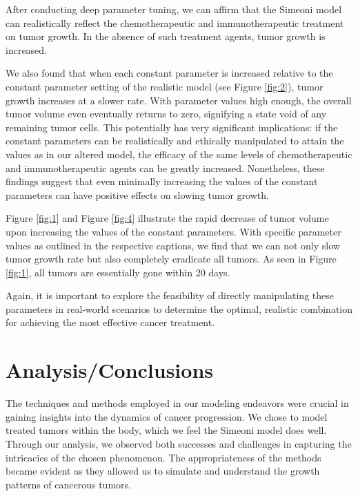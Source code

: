 \documentclass[11pt,reqno]{amsart}
\begin{document}
After conducting deep parameter tuning, we can affirm that the Simeoni model can realistically reflect the chemotherapeutic and immunotherapeutic treatment on tumor growth. In the absence of such treatment agents, tumor growth is increased.

We also found that when each constant parameter is increased relative to the constant parameter setting of the realistic model (see Figure \ref{fig:2}), tumor growth increases at a slower rate. With parameter values high enough, the overall tumor volume even eventually returns to zero, signifying a state void of any remaining tumor cells. This potentially has very significant implications: if the constant parameters can be realistically and ethically manipulated to attain the values as in our altered model, the efficacy of the same levels of chemotherapeutic and immunotherapeutic agents can be greatly increased. Nonetheless, these findings suggest that even minimally increasing the values of the constant parameters can have positive effects on slowing tumor growth.

Figure \ref{fig:1} and Figure \ref{fig:4} illustrate the rapid decrease of tumor volume upon increasing the values of the constant parameters. With specific parameter values as outlined in the respective captions, we find that we can not only slow tumor growth rate but also completely eradicate all tumors. As seen in Figure \ref{fig:1}, all tumors are essentially gone within 20 days.



Again, it is important to explore the feasibility of directly manipulating these parameters in real-world scenarios to determine the optimal, realistic combination for achieving the most effective cancer treatment.  


\section{Analysis/Conclusions}
The techniques and methods employed in our modeling endeavors were crucial in gaining insights into the dynamics of cancer progression. We chose to model treated tumors within the body, which we feel the Simeoni model does well. Through our analysis, we observed both successes and challenges in capturing the intricacies of the chosen phenomenon. The appropriateness of the methods became evident as they allowed us to simulate and understand the growth patterns of cancerous tumors. 
\end{document}
